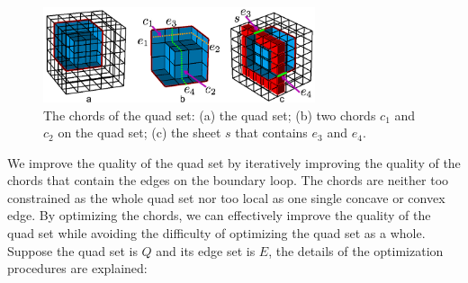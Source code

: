 \documentclass[final,5p,times,twocolumn]{elsarticle}
\begin{document}
\begin{figure}[htbp]
\begin{center}
\includegraphics[width=8cm]{qs_dual.png}
\caption{The chords of the quad set: (a) the quad set; (b) two chords $c_1$ and $c_2$ on the quad set; (c) the sheet $s$ that contains $e_3$ and $e_4$.}
\label{fig:qs_dual}
\end{center}
\end{figure}

We improve the quality of the quad set by iteratively improving the quality of the chords that contain the edges on the boundary loop. The chords are neither too constrained as the whole quad set nor too local as one single concave or convex edge. By optimizing the chords, we can effectively improve the quality of the quad set while avoiding the difficulty of optimizing the quad set as a whole. Suppose the quad set is $Q$ and its edge set is $E$, the details of the optimization procedures are explained:
\end{document}
